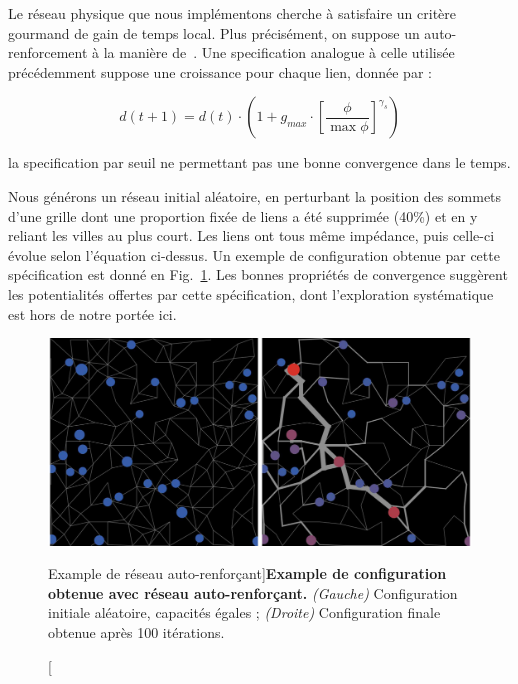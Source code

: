 Le réseau physique que nous implémentons cherche à satisfaire un critère gourmand de gain de temps local. Plus précisément, on suppose un auto-renforcement à la manière de~\cite{tero2010rules}. Une specification analogue à celle utilisée précédemment suppose une croissance pour chaque lien, donnée par :

\[
d(t+1) = d(t)\cdot \left(1 + g_{max} \cdot \left[\frac{\phi}{\max \phi}\right]^{\gamma_s}\right)
\]


la specification par seuil ne permettant pas une bonne convergence dans le temps.


Nous générons un réseau initial aléatoire, en perturbant la position des sommets d'une grille dont une proportion fixée de liens a été supprimée (40\%) et en y reliant les villes au plus court. Les liens ont tous même impédance, puis celle-ci évolue selon l'équation ci-dessus. Un exemple de configuration obtenue par cette spécification est donné en Fig.~\ref{fig:macrocoevolution:slimemould}. Les bonnes propriétés de convergence suggèrent les potentialités offertes par cette spécification, dont l'exploration systématique est hors de notre portée ici.


\begin{figure}
	\includegraphics[width=\linewidth]{Figures/Final/6-2-3-fig-macrocoevol-slimemould}
	\caption[][Example de réseau auto-renforçant]{}{\textbf{Example de configuration obtenue avec réseau auto-renforçant.} \textit{(Gauche)} Configuration initiale aléatoire, capacités égales ; \textit{(Droite)} Configuration finale obtenue après 100 itérations.\label{fig:macrocoevolution:slimemould}}
\end{figure}


